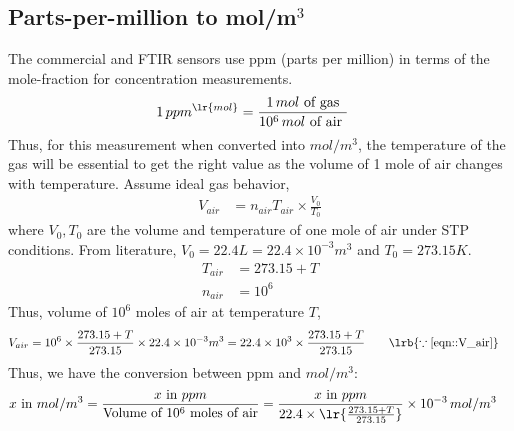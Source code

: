 \subsection{Parts-per-million to mol/m$^3$}
The commercial and FTIR sensors use ppm (parts per million) in terms of the mole-fraction for concentration
measurements.
\begin{align}
    1 \, ppm^{\lr{mol}} &= \frac{1 \, mol \text{ of gas}}{10^6 \, mol \text{ of air }}
\end{align}
Thus, for this measurement when converted into $mol/m^3$, the temperature of the gas will be essential to get the right
value as the volume of 1 mole of air changes with temperature. Assume ideal gas behavior,
\begin{align}
    V_{air} &= n_{air} T_{air} \times \frac{V_0}{T_0}
    \label{eqn::V_air}
\end{align}
where $V_0, T_0$ are the volume and temperature of one mole of air under STP conditions. From literature,
$V_0 = 22.4 L = 22.4 \times 10^{-3} m^3$ and $T_0 = 273.15 K$.
\begin{align*}
    T_{air} &= 273.15 + T\\
    n_{air} &= 10^6
\end{align*}
Thus, volume of $10^6$ moles of air at temperature $T$,
\begin{align}
    V_{air} &= 10^6 \times \frac{273.15 + T}{273.15} \times 22.4 \times 10^{-3} m^3
            = 22.4 \times 10^{3} \times \frac{273.15 + T}{273.15}
    \qquad \lrb{\because \ref{eqn::V_air}}
\end{align}
Thus, we have the conversion between ppm and $mol/m^3$:
\begin{align}
    x \text{ in } mol/m^3 &= \frac{x \text{ in } ppm }{\text{Volume of } 10^6 \text{ moles of air}}
                            = \frac{x \text{ in } ppm}{22.4 \times \lr{\frac{273.15 + T}{273.15}}}
                                \times 10^{-3} \, mol/m^3
\end{align}
